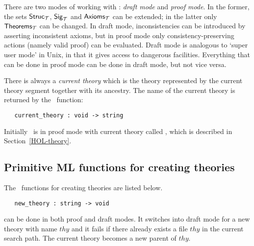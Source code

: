 {There are two modes of working with \HOL: {\it draft mode\/} and {\it proof
mode\/}.
In the former, the sets ${\sf Struc}_{\cal T}$, ${\sf Sig}_{\cal T}$
and ${\sf Axioms}_{\cal T}$ can be extended; in the latter only ${\sf
Theorems}_{\cal T}$ can be changed. In draft mode, inconsistencies can be
introduced by asserting inconsistent axioms, but in proof mode only
consistency-preserving actions (namely valid proof) can be evaluated. Draft mode is
analogous to `super user mode' in Unix, in that it gives access to dangerous
facilities. Everything that can be done in proof mode can be done in draft
mode, but not vice versa.

There is always a {\it current theory\/} which is the theory represented by
the current theory segment together with its ancestry. The name of the current
theory is returned by the \ML\ function:

\begin{boxed}
\begin{verbatim}
   current_theory : void -> string
\end{verbatim}\end{boxed}

Initially \HOL\ is in proof mode with current
theory called , which is described in Section~\ref{HOL-theory}.

\subsection{Primitive ML functions for creating theories}
\label{theoryprims}

The \ML\ functions for creating theories are listed below.

\begin{boxed}
\begin{verbatim}
   new_theory : string -> void
\end{verbatim}\end{boxed}

\noindent {} can be done in both
proof and
draft modes. It
switches into draft mode for a new theory with name $thy$ and it fails if
there already exists a file $thy$ in the current search path. The
current theory becomes a new parent of $thy$.


}
